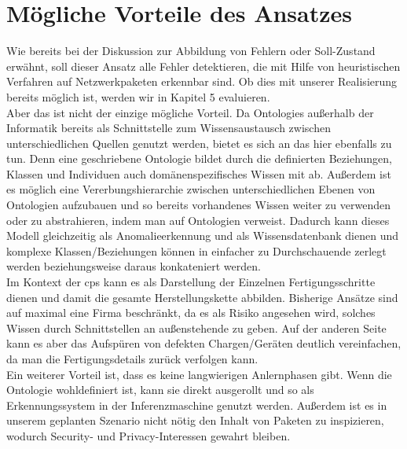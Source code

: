 \section{\nohyphens{Mögliche Vorteile des Ansatzes}}
Wie bereits bei der Diskussion zur Abbildung von Fehlern oder Soll-Zustand erwähnt, soll dieser Ansatz alle Fehler detektieren, die mit Hilfe von heuristischen Verfahren auf Netzwerkpaketen erkennbar sind. Ob dies mit unserer Realisierung bereits möglich ist, werden wir in Kapitel 5 evaluieren.\\
Aber das ist nicht der einzige mögliche Vorteil. Da \Glspl{Ontologie} außerhalb der Informatik bereits als Schnittstelle zum Wissensaustausch zwischen unterschiedlichen Quellen genutzt werden, bietet es sich an das hier ebenfalls zu tun. Denn eine geschriebene Ontologie bildet durch die definierten Beziehungen, Klassen und Individuen auch domänenspezifisches Wissen mit ab. Außerdem ist es möglich eine Vererbungshierarchie zwischen unterschiedlichen Ebenen von Ontologien aufzubauen und so bereits vorhandenes Wissen weiter zu verwenden oder zu abstrahieren, indem man auf Ontologien verweist. Dadurch kann dieses Modell gleichzeitig als Anomalieerkennung und als Wissensdatenbank dienen und komplexe Klassen/Beziehungen können  in einfacher zu Durchschauende zerlegt werden beziehungsweise daraus konkateniert werden.\\ Im Kontext der \acrlong{cps} kann es als Darstellung der Einzelnen Fertigungsschritte dienen und damit die gesamte Herstellungskette abbilden. Bisherige Ansätze sind auf maximal eine Firma beschränkt, da es als Risiko angesehen wird, solches Wissen durch Schnittstellen an außenstehende zu geben. Auf der anderen Seite kann es aber das Aufspüren von defekten Chargen/Geräten deutlich vereinfachen, da man die Fertigungsdetails zurück verfolgen kann. \\
Ein weiterer Vorteil ist, dass es keine langwierigen Anlernphasen gibt. Wenn die Ontologie wohldefiniert ist, kann sie direkt ausgerollt und so als Erkennungssystem in der Inferenzmaschine genutzt werden. Außerdem ist es in unserem geplanten Szenario nicht nötig den Inhalt von Paketen zu inspizieren, wodurch Security- und Privacy-Interessen gewahrt bleiben.\\